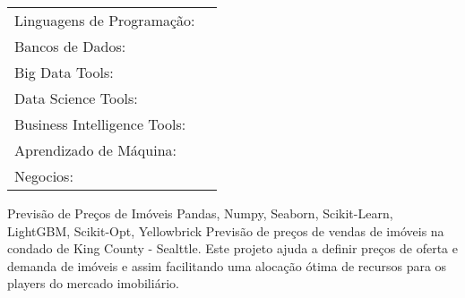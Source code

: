 \documentclass[11pt, letter]{awesome-cv}
\begin{document}
\vspace{-5mm}
\vspace{-3mm}
\begin{cventries}
	\vspace{-2mm}
	\cventry
	{}
	{\def\arraystretch{1.15}{\begin{tabular}{ l l }
				Linguagens de Programação:  & {\skill{ Python,  SQL}} \\
				Bancos de Dados: & {\skill{ MySQL, SQLServer, PostgreSQL}} \\
				Big Data Tools:  & {\skill{ Microsoft Azure Machine Learning}} \\
				Data Science Tools:  & {\skill{ Numpy, Pandas, Matplotlib, Seaborn, Scikit-Learn, LightGBM}} \\
				Business Intelligence Tools:  & {\skill{ Microsoft Power BI, Google Data Studio}} \\
				Aprendizado de Máquina:  & {\skill{ Regressão, Classificação, Clusterização}} \\
				Negocios:  & {\skill{ Formação de Preços, Gerenciamento de Projetos, Modelagem de Processos, Pesquisa de Mercado}} \\
	\end{tabular}}}
	{}
	{}
	{}
\end{cventries}
\vspace{-14mm}
\vspace{-2mm}
\begin{cventries}
  \cventry
    {}
    {Previsão de Preços de Imóveis\vspace{1mm}}
    {Pandas, Numpy, Seaborn, Scikit-Learn, LightGBM, Scikit-Opt, Yellowbrick\vspace{-4mm}}
	{\vspace{1mm}}
	{Previsão de preços de vendas de imóveis na condado de King County - Sealttle. Este projeto ajuda a definir preços de oferta e demanda de imóveis e assim facilitando uma alocação ótima de recursos para os players do mercado imobiliário.}

	
\end{cventries}
\end{document}
